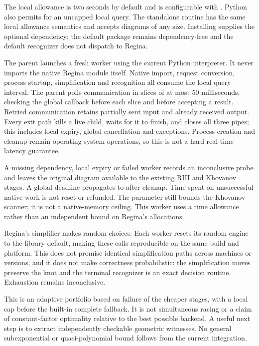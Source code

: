 The local allowance is two seconds by default and is configurable with
.  Python also permits 
for an uncapped local query.  The standalone  routine
has the same local allowance semantics and accepts diagrams of any size.
Installing  supplies the optional dependency;
the default package remains dependency-free and the default recognizer
does not dispatch to Regina.

The parent launches a fresh worker using the current Python interpreter.
It never imports the native Regina module itself.  Native import, request
conversion, process startup, simplification and recognition all consume
the local query interval.  The parent polls communication in slices of at
most 50 milliseconds, checking the global callback before each slice and
before accepting a result.  Retried communication retains partially sent
input and already received output.  Every exit path kills a live child,
waits for it to finish, and closes all three pipes; this includes local
expiry, global cancellation and exceptions.  Process creation and cleanup
remain operating-system operations, so this is not a hard real-time
latency guarantee.

A missing dependency, local expiry or failed worker records an inconclusive
probe and leaves the original diagram available to the existing RIII and
Khovanov stages.  A global deadline propagates to  after
cleanup.  Time spent on unsuccessful native work is not reset or refunded.
The  parameter still bounds the Khovanov scanner; it is
not a native-memory ceiling.  This worker uses a time allowance rather
than an independent bound on Regina's allocations.

Regina's simplifier makes random choices.  Each worker resets its random
engine to the library default, making these calls reproducible on the same
build and platform.  This does not promise identical simplification paths
across machines or versions, and it does not make correctness probabilistic:
the simplification moves preserve the knot and the terminal recognizer is
an exact decision routine.  Exhaustion remains inconclusive.

This is an adaptive portfolio based on failure of the cheaper stages,
with a local cap before the built-in complete fallback.  It is not
simultaneous racing or a claim of constant-factor optimality relative to
the best possible backend.  A useful next step is to extract independently
checkable geometric witnesses.  No general subexponential or
quasi-polynomial bound follows from the current integration.

